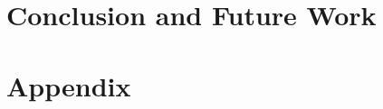 \documentclass[logo,msc,ai]{infthesis}           %
\begin{document}
\chapter{Conclusion and Future Work} \label{ch:conc}




\appendix
\chapter{Appendix}  \label{chap:appendix}
\end{document}
